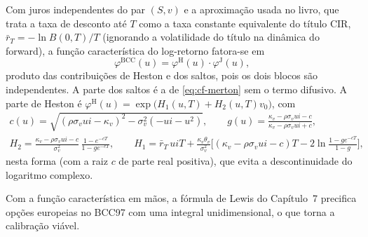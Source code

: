 \begin{corolario}
Com juros independentes do par $(S,v)$ e a aproximação usada no livro, que trata a taxa de desconto até $T$ como a taxa constante equivalente do título CIR, $\bar r_T=-\ln B(0,T)/T$ (ignorando a volatilidade do título na dinâmica do forward), a função característica do log-retorno fatora-se em
\begin{equation}
\varphi^{\mathrm{BCC}}(u)=\varphi^{\mathrm{H}}(u)\cdot\varphi^{\mathrm{J}}(u),
\end{equation}
produto das contribuições de Heston e dos saltos, pois os dois blocos são independentes. A parte dos saltos é a de \eqref{eq:cf-merton} sem o termo difusivo. A parte de Heston é
$\varphi^{\mathrm H}(u)=\exp\big(H_1(u,T)+H_2(u,T)v_0\big)$, com
\begin{gather}
c(u)=\sqrt{(\rho\sigma_vui-\kappa_v)^2-\sigma_v^2(-ui-u^2)},\qquad g(u)=\frac{\kappa_v-\rho\sigma_vui-c}{\kappa_v-\rho\sigma_vui+c},\\
H_2=\frac{\kappa_v-\rho\sigma_vui-c}{\sigma_v^2}\,\frac{1-e^{-cT}}{1-ge^{-cT}},\qquad
H_1=\bar r_T\,uiT+\frac{\kappa_v\theta_v}{\sigma_v^2}\Big[(\kappa_v-\rho\sigma_vui-c)T-2\ln\frac{1-ge^{-cT}}{1-g}\Big],
\end{gather}
nesta forma (com a raiz $c$ de parte real positiva), que evita a descontinuidade do logaritmo complexo.
\end{corolario}

Com a função característica em mãos, a fórmula de Lewis do Capítulo~7 precifica opções europeias no BCC97 com uma integral unidimensional, o que torna a calibração viável.
